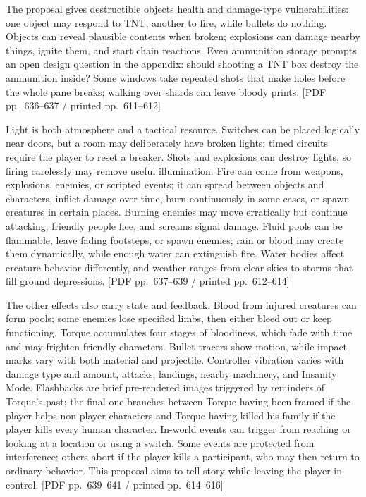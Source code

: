 The proposal gives destructible objects health and damage-type vulnerabilities: one object may respond to TNT, another to fire, while bullets do nothing. Objects can reveal plausible contents when broken; explosions can damage nearby things, ignite them, and start chain reactions. Even ammunition storage prompts an open design question in the appendix: should shooting a TNT box destroy the ammunition inside? Some windows take repeated shots that make holes before the whole pane breaks; walking over shards can leave bloody prints. {[}PDF pp.~636--637 / printed pp.~611--612{]}

Light is both atmosphere and a tactical resource. Switches can be placed logically near doors, but a room may deliberately have broken lights; timed circuits require the player to reset a breaker. Shots and explosions can destroy lights, so firing carelessly may remove useful illumination. Fire can come from weapons, explosions, enemies, or scripted events; it can spread between objects and characters, inflict damage over time, burn continuously in some cases, or spawn creatures in certain places. Burning enemies may move erratically but continue attacking; friendly people flee, and screams signal damage. Fluid pools can be flammable, leave fading footsteps, or spawn enemies; rain or blood may create them dynamically, while enough water can extinguish fire. Water bodies affect creature behavior differently, and weather ranges from clear skies to storms that fill ground depressions. {[}PDF pp.~637--639 / printed pp.~612--614{]}

The other effects also carry state and feedback. Blood from injured creatures can form pools; some enemies lose specified limbs, then either bleed out or keep functioning. Torque accumulates four stages of bloodiness, which fade with time and may frighten friendly characters. Bullet tracers show motion, while impact marks vary with both material and projectile. Controller vibration varies with damage type and amount, attacks, landings, nearby machinery, and Insanity Mode. Flashbacks are brief pre-rendered images triggered by reminders of Torque's past; the final one branches between Torque having been framed if the player helps non-player characters and Torque having killed his family if the player kills every human character. In-world events can trigger from reaching or looking at a location or using a switch. Some events are protected from interference; others abort if the player kills a participant, who may then return to ordinary behavior. This proposal aims to tell story while leaving the player in control. {[}PDF pp.~639--641 / printed pp.~614--616{]}

